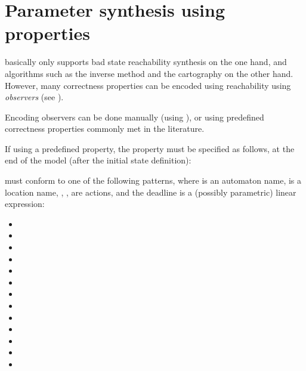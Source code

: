 \section{Parameter synthesis using properties}\label{ss:mode:prop}

\imitator{} basically only supports bad state reachability synthesis on the one hand, and algorithms such as the inverse method and the cartography on the other hand.
However, many correctness properties can be encoded using reachability using \emph{observers} (see \cite{ABL98,ABBL98,Andre13ICECCS}).

Encoding observers can be done manually (using \adhoc{} \IPTA{}), or using predefined correctness properties commonly met in the literature.

If using a predefined property, the property must be specified as follows, at the end of the model (after the initial state definition):


\styleIMI{[PROP]} must conform to one of the following patterns, where  is an automaton name,  is a location name, , ,  are actions, and the deadline  is a (possibly parametric) linear expression:

\begin{itemize}
	\item {}
	\item {}
	\item {}
	\item {}
	\item {}
	\item {}
	\item {}
	\item {}
	\item {}
	\item {}
	\item {}
	\item {}
	\item {}
\end{itemize}

